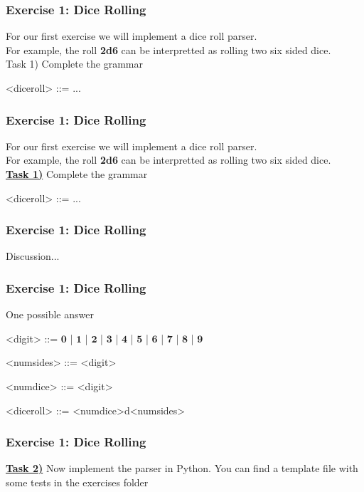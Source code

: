 \documentclass{beamer}
\begin{document}
\begin{frame}[fragile]
\frametitle{Exercise 1: Dice Rolling}
For our first exercise we will implement a dice roll parser. \\
\medskip
For example, the roll \textbf{2d6} can be interpretted as rolling two six sided dice. \\
\bigskip
Task 1) Complete the grammar 
\begin{grammar}
<diceroll> ::= ...
\end{grammar}
\end{frame}


\begin{frame}[fragile]
\frametitle{Exercise 1: Dice Rolling}
For our first exercise we will implement a dice roll parser. \\
\medskip
For example, the roll \textbf{2d6} can be interpretted as rolling two six sided dice. \\
\bigskip
\textbf{\underline{Task 1)}} Complete the grammar 
\medskip
\begin{grammar}
<diceroll> ::= ...
\end{grammar}
\end{frame}


\begin{frame}[fragile]
\frametitle{Exercise 1: Dice Rolling}
\begin{center}
Discussion...
\end{center}

\end{frame}

\begin{frame}[fragile]
\frametitle{Exercise 1: Dice Rolling}
One possible answer
\bigskip
\begin{grammar}
<digit> ::= $\mathbf{0}$ | $\mathbf{1}$ | $\mathbf{2}$ | $\mathbf{3}$ | $\mathbf{4}$ | $\mathbf{5}$ | $\mathbf{6}$ | $\mathbf{7}$ | $\mathbf{8}$ | $\mathbf{9}$

<numsides> ::= <digit>

<numdice> ::= <digit>

<diceroll> ::= <numdice>d<numsides>
\end{grammar}

\end{frame}

\begin{frame}
\frametitle{Exercise 1: Dice Rolling}
\textbf{\underline{Task 2)}} Now implement the parser in Python. You can find a template file with some tests in the exercises folder
\end{frame}
\end{document}
